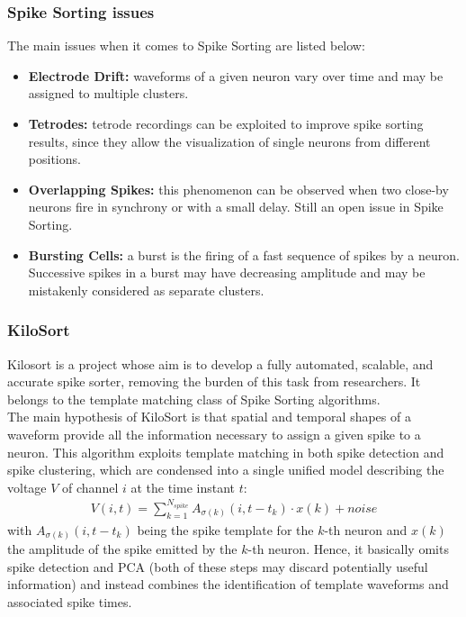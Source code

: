 \subsubsection{Spike Sorting issues}
The main issues when it comes to Spike Sorting are listed below:
\begin{itemize}
    \item \textbf{Electrode Drift:} waveforms of a given neuron vary over
          time and may be assigned to multiple clusters.
    \item \textbf{Tetrodes:} tetrode recordings can be exploited to improve
          spike sorting results, since they allow the visualization of single
          neurons from different positions.
    \item \textbf{Overlapping Spikes:} this phenomenon can be observed when
          two close-by neurons fire in synchrony or with a small delay. Still
          an open issue in Spike Sorting.
    \item \textbf{Bursting Cells:} a burst is the firing of a fast sequence
          of spikes by a neuron. Successive spikes in a burst may have decreasing
          amplitude and may be mistakenly considered as separate clusters.
\end{itemize}
\subsubsection{KiloSort}
Kilosort is a project whose aim is to develop a fully automated, scalable, and accurate
spike sorter, removing the burden of this task from researchers. It belongs to the
template matching class of Spike Sorting algorithms.\\
The main hypothesis of KiloSort is that spatial and temporal shapes of a waveform
provide all the information necessary to assign a given spike to a neuron. This
algorithm exploits template matching in both spike detection and spike clustering,
which are condensed into a single unified model describing the voltage \(V\) of channel
\(i\) at the time instant \(t\):
\begin{align*}
    V(i,t)=\sum_{k=1}^{N_{spike}}A_{\sigma(k)}(i,t-t_k)\cdot x(k) + noise
\end{align*}
with \(A_{\sigma(k)}(i,t-t_k)\) being the spike template for the \(k\)-th neuron
and \(x(k)\) the amplitude of the spike emitted by the \(k\)-th neuron. Hence, it
basically omits spike detection and PCA (both of these steps may discard potentially
useful information) and instead combines the identification of template waveforms and
associated spike times.
